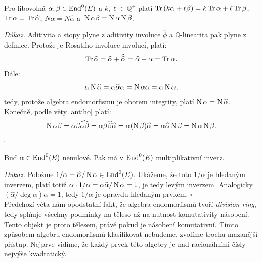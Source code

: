 \documentclass[12pt]{report}
\begin{document}
\begin{veta}
Pro libovolná $\alpha,\beta \in \operatorname{End}^0 (E)$ a $k, \ell \in \mathbb{Q}^{+}$ platí $\operatorname{Tr} \left( k\alpha + \ell \beta \right) = k\operatorname{Tr} \alpha + \ell\operatorname{Tr} \beta$, $\operatorname{Tr} \alpha = \operatorname{Tr} \widehat{\alpha}$, $N \alpha = N \widehat{\alpha}$ a~$\operatorname{N} \alpha \beta = \operatorname{N} \alpha \operatorname{N} \beta$.
\end{veta}
\noindent \textit{Důkaz.} Aditivita a stopy plyne z aditivity involuce $\widehat{\phi}$ a $\mathbb{Q}$-linearita pak plyne z definice. Protože je Rosatiho involuce involucí, platí:
\begin{equation*}
\operatorname{Tr} \widehat{\alpha} = \widehat{\alpha} + \widehat{\widehat{\alpha}} = \widehat{\alpha} + \alpha = \operatorname{Tr} \alpha.
\end{equation*}
Dále:
\begin{equation*}
\alpha \operatorname{N} \widehat{\alpha} = \alpha \widehat{\alpha} \alpha = \operatorname{N} \alpha \alpha = \alpha \operatorname{N} \alpha,
\end{equation*} tedy, protože algebra endomorfismu je oborem integrity, platí $\operatorname{N} \alpha = \operatorname{N} \widehat{\alpha}$. Konečně, podle věty \ref{antiho} platí:
\begin{equation*}
\operatorname{N} \alpha \beta = \alpha \beta \widehat{\alpha \beta} = \alpha \beta \widehat{\beta} \widehat{\alpha} = \alpha (\operatorname{N} \beta) \widehat{\alpha} = \alpha \widehat{\alpha} \operatorname{N} \beta = \operatorname{N} \alpha \operatorname{N} \beta.
\end{equation*}
\hfill $\square$\\


\begin{dusledek}
Buď $\alpha \in \operatorname{End}^0 (E)$ nenulové. Pak má v $\operatorname{End}^0 (E)$ multiplikativní inverz.
\end{dusledek}
\noindent \textit{Důkaz.} Položme $1/\alpha = \widehat{\alpha}/\operatorname{N} \alpha \in \operatorname{End}^0 (E)$. Ukážeme, že toto $1/\alpha$ je hledaným inverzem, platí totiž $\alpha \cdot 1/ \alpha = \alpha \widehat{\alpha} /\operatorname{N} \alpha = 1$, je tedy levým inverzem. Analogicky $(\widehat{\alpha}/\deg \alpha) \alpha =  1$, tedy $1/\alpha$ je opravdu hledaným prvkem. \hfill $\square$\\

Předchozí věta nám opodstatní fakt, že algebra endomorfismů tvoří \textit{division ring}, tedy splňuje všechny podmínky na těleso až na nutnost komutativity násobení. Tento objekt je proto tělesem, právě pokud je násobení komutativní. Tímto způsobem algebru endomorfismů klasifikovat nebudeme, zvolíme trochu mazanější přístup. Nejprve vidíme, že každý prvek této algebry je nad racionálními čísly nejvýše kvadratický.\\
\end{document}
